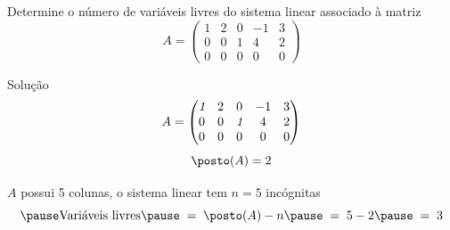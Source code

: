 \begin{question}
  Determine o número de variáveis livres do sistema linear associado à matriz
  \[
    A =
    \begin{pmatrix}
      1 & 2 & 0 & -1 & 3 \\
      0 & 0 & 1 & 4  & 2 \\
      0 & 0 & 0 & 0  & 0
    \end{pmatrix}
  \]
\end{question}

\begin{resolution}{Solução}
  \[
    A =
    \begin{pmatrix}
      \emph{1} & 2 & 0        & -1 & 3 \\
      0        & 0 & \emph{1} & 4  & 2 \\
      0        & 0 & 0        & 0  & 0
    \end{pmatrix}
  \]
  \pause
  \[
    \posto(A) = 2
  \]

  \pause
  $A$ possui 5 colunas,
  \pause
  o sistema linear tem \emph{$n = 5$} incógnitas
  \[
    \pause
    \text{Variáveis livres}
    \pause
    \;=\;
    \posto(A) - n
    \pause
    \;=\;
    5 - 2
    \pause
    \;=\;
    3
  \]
\end{resolution}

\endinput
